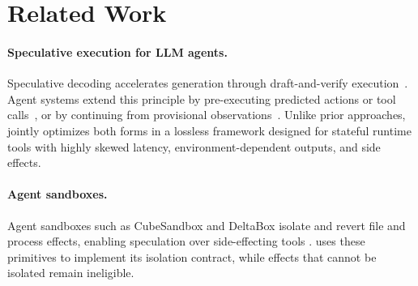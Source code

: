 \section{Related Work}

\paragraph{Speculative execution for LLM agents.}
Speculative decoding accelerates generation through draft-and-verify execution~\citep{cai2024medusa, li2026eagle,chen2024hardware}. 
Agent systems extend this principle by pre-executing predicted actions or tool calls~\citep{ye2025speculative,bpaste2026,spectoolcalls2025,spork2026, zhong2026dualspec, sui2026parallelizing}, or by continuing from provisional observations~\citep{saberi2026spechop, cao2026auton}. 
Unlike prior approaches, \sysname{} jointly optimizes both forms in a lossless framework designed for stateful runtime tools with highly skewed latency, environment-dependent outputs, and side effects.

\paragraph{Agent sandboxes.}
Agent sandboxes such as CubeSandbox and DeltaBox isolate and revert file and process effects, enabling speculation over side-effecting tools \citep{cubesandbox_2026,deltabox2026}. \sysname{} uses these primitives to implement its isolation contract, while effects that cannot be isolated remain ineligible.